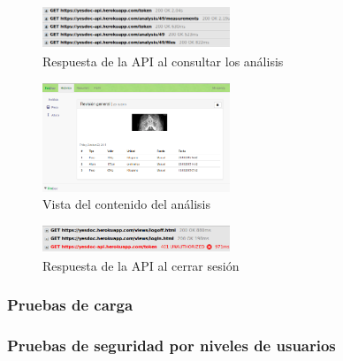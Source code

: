 \documentclass[a4paper,12pt]{article}
\begin{document}
    \begin{figure}[h]
        \centering
        \includegraphics[width=0.5\textwidth]{img/5-analisis}
        \caption{Respuesta de la API al consultar los análisis}
		\label{5-analisis}
    \end{figure}
    
    \begin{figure}[h]
        \centering
        \includegraphics[width=0.5\textwidth]{img/5-contenido_analisis}
        \caption{Vista del contenido del análisis}
		\label{5-contenido_analisis}
    \end{figure}
    
    \begin{figure}[h]
        \centering
        \includegraphics[width=0.5\textwidth]{img/5-logoff}
        \caption{Respuesta de la API al cerrar sesión}
		\label{5-logoff}
    \end{figure}
    



\clearpage



\subsubsection{ Pruebas de carga}

\subsubsection{ Pruebas de seguridad por niveles de usuarios}
\end{document}
